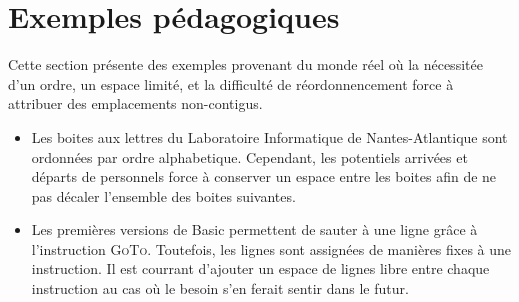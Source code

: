 
\section{Exemples pédagogiques}

Cette section présente des exemples provenant du monde réel où la nécessitée
d'un ordre, un espace limité, et la difficulté de réordonnencement force à
attribuer des emplacements non-contigus.

\begin{itemize}
\item Les boites aux lettres du Laboratoire Informatique de Nantes-Atlantique
  sont ordonnées par ordre alphabetique. Cependant, les potentiels arrivées et
  départs de personnels force à conserver un espace entre les boites afin de ne
  pas décaler l'ensemble des boites suivantes.
\item Les premières versions de Basic permettent de sauter à une ligne grâce à
  l'instruction \textsc{GoTo}. Toutefois, les lignes sont assignées de manières
  fixes à une instruction. Il est courrant d'ajouter un espace de lignes libre
  entre chaque instruction au cas où le besoin s'en ferait sentir dans le futur.
\end{itemize}
